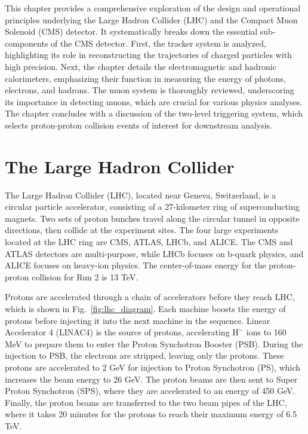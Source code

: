 \graphicspath{{2_Experimental_Apparatus/Figures/}}

\label{chap:apparatus}

This chapter provides a comprehensive exploration of the design and operational principles underlying 
the Large Hadron Collider (LHC) and the Compact Muon Solenoid (CMS) detector. 
It systematically breaks down the essential sub-components of the CMS detector. 
First, the tracker system is analyzed, highlighting its role in reconstructing the 
trajectories of charged particles with high precision. 
Next, the chapter details the electromagnetic and hadronic calorimeters, 
emphasizing their function in measuring the energy of photons, 
electrons, and hadrons. The muon system is thoroughly reviewed, 
underscoring its importance in detecting muons, which are crucial for various physics analyses. 
The chapter concludes with a discussion of the two-level triggering system, which 
selects proton-proton collision events of interest for downstream analysis.

\finishchapterabstract

\section{The Large Hadron Collider}
\label{sec:large_had_collider}

The Large Hadron Collider (LHC), located near Geneva, Switzerland, is a circular particle accelerator, 
consisting of a 27-kilometer ring of superconducting magnets.
Two sets of proton bunches travel along the circular tunnel in opposite directions,
then collide at the experiment sites. The four large experiments located at the LHC ring are CMS, ATLAS, LHCb, and ALICE. The CMS and ATLAS
detectors are multi-purpose, while LHCb focuses on b-quark physics, and ALICE focuses on heavy-ion physics. The center-of-mass energy 
for the proton-proton collision for Run 2 is 13 TeV.

Protons are accelerated through a chain of accelerators before they reach LHC, which is shown in Fig.~\ref{fig:lhc_diagram}.
Each machine boosts the energy of protons before injecting it into the next machine in the sequence. Linear Accelerator 4 (LINAC4)
is the source of protons, accelerating $\textrm{H}^{-}$ ions to 160 MeV to prepare them to enter the Proton Synchotron Booster (PSB). During the injection
to PSB, the electrons are stripped, leaving only the protons. These protons are accelerated to 2 GeV for injection to Proton 
Synchotron (PS), which increases the beam energy to 26 GeV. The proton beams are then sent to Super Proton Synchotron (SPS), where they are accelerated
to an energy of 450 GeV. Finally, the proton beams are transferred to the two beam pipes of the LHC, where it takes 20 minutes for the protons to reach
their maximum energy of 6.5 TeV. 


